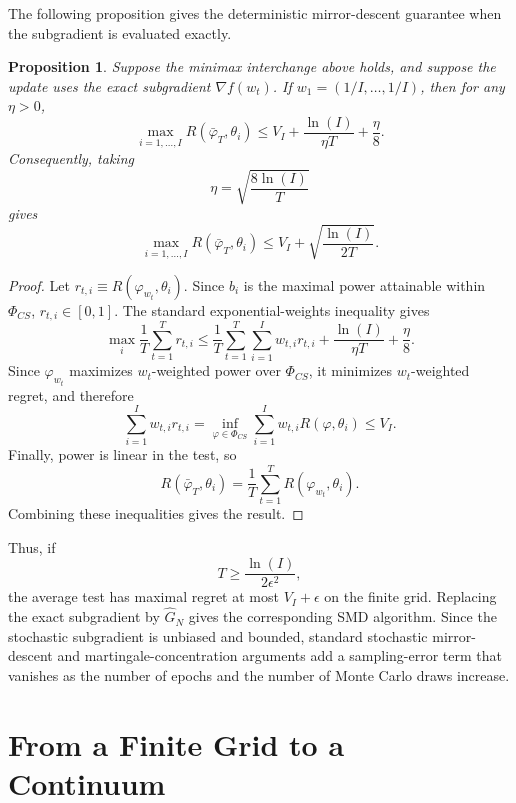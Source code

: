 \documentclass{article}
\theoremstyle{definition}
\theoremstyle{plain}
\newtheorem{prop}{Proposition}
\theoremstyle{remark}
\begin{document}
The following proposition gives the deterministic mirror-descent guarantee when the subgradient is evaluated exactly.

\begin{prop}
Suppose the minimax interchange above holds, and suppose the update uses the exact subgradient \(\nabla f(w_t)\). If \(w_1=(1/I,\ldots,1/I)\), then for any \(\eta>0\),
\[\max_{i=1,\ldots,I}R(\bar{\varphi}_T,\theta_i)\leq V_I+\frac{\ln(I)}{\eta T}+\frac{\eta}{8}.\]
Consequently, taking
\[\eta=\sqrt{\frac{8\ln(I)}{T}}\]
gives
\[\max_{i=1,\ldots,I}R(\bar{\varphi}_T,\theta_i)\leq V_I+\sqrt{\frac{\ln(I)}{2T}}.\]
\end{prop}

\begin{proof}
Let \(r_{t,i}\equiv R(\varphi_{w_t},\theta_i)\). Since \(b_i\) is the maximal power attainable within \(\Phi_{CS}\), \(r_{t,i}\in[0,1]\). The standard exponential-weights inequality gives
\[\max_i\frac{1}{T}\sum_{t=1}^Tr_{t,i}\leq\frac{1}{T}\sum_{t=1}^T\sum_{i=1}^Iw_{t,i}r_{t,i}+\frac{\ln(I)}{\eta T}+\frac{\eta}{8}.\]
Since \(\varphi_{w_t}\) maximizes \(w_t\)-weighted power over \(\Phi_{CS}\), it minimizes \(w_t\)-weighted regret, and therefore
\[\sum_{i=1}^Iw_{t,i}r_{t,i}=\inf_{\varphi\in\Phi_{CS}}\sum_{i=1}^Iw_{t,i}R(\varphi,\theta_i)\leq V_I.\]
Finally, power is linear in the test, so
\[R(\bar{\varphi}_T,\theta_i)=\frac{1}{T}\sum_{t=1}^TR(\varphi_{w_t},\theta_i).\]
Combining these inequalities gives the result.
\end{proof}

Thus, if
\[T\geq\frac{\ln(I)}{2\epsilon^2},\]
the average test has maximal regret at most \(V_I+\epsilon\) on the finite grid. Replacing the exact subgradient by \(\widehat{G}_N\) gives the corresponding SMD algorithm. Since the stochastic subgradient is unbiased and bounded, standard stochastic mirror-descent and martingale-concentration arguments add a sampling-error term that vanishes as the number of epochs and the number of Monte Carlo draws increase.

\section{From a Finite Grid to a Continuum}
\end{document}
